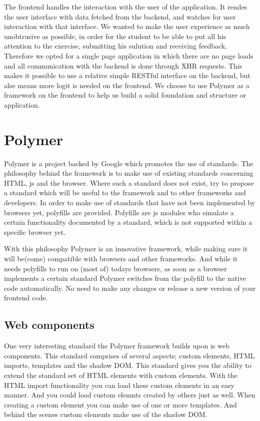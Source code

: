 %

The frontend handles the interaction with the user of the application.
It rendes the user interface with data fetched from the backend,
and watches for user interaction with that interface.
We wanted to make the user experience as much unobtrusive as possible,
in order for the student to be able to put all his attention
to the exercise, submitting his sulution and receiving feedback.
Therefore we opted for a single page application
in which there are no page loads
and all communication with the backend is done through XHR requests.
This makes it possible
to use a relative simple RESTful interface on the backend,
but alse means more logit is needed on the frontend.
We choose to use Polymer as a framework on the frontend
to help us build a solid foundation and structure or application.

\section{Polymer}
Polymer is a project backed by Google which promotes the use of standards.
The philosophy behind the framework is to make use of existing standards
concerning HTML, \gls{js} and the browser.
Where such a standard does not exist,
try to propose a standard which will be useful to the framework
and to other frameworks and developers.
In order to make use of standards
that have not been implemented by browsers yet,
polyfills are provided.
Polyfills are \gls{js} modules
who simulate a certain functionality documented by a standard,
which is not supported within a specific browser yet.

With this philosophy Polymer is an innovative framework,
while making sure it will be(come) compatible with browsers
and other frameworks.
And while it needs polyfills to run on (most of) todays browsers,
as soon as a browser implements a certain standard
Polymer switches from the polyfill to the native code automatically.
No need to make any changes or release a new version of your frontend code.

\subsection{Web components}
One very interesting standard the Polymer framework builds upon
is web components.
This standard comprises of several aspects;
custom elements, HTML imports, templates and the shadow DOM.
This standard gives you the ability
to extend the standard set of HTML elements with custom elements.
With the HTML import functionality you can load these custom elements
in an easy manner.
And you could load custom elemnts created by others just as well.
When creating a custom element you can make use of one or more templates.
And behind the scenes custom elements make use of the shadow DOM.

